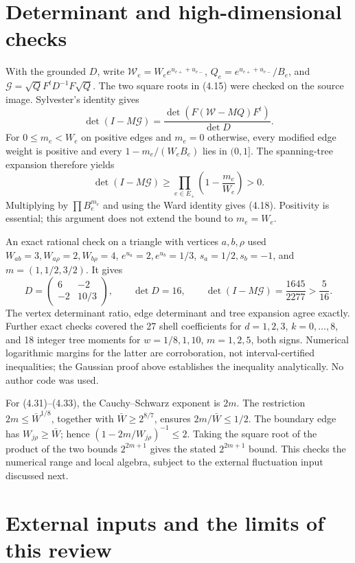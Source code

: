 \documentclass[10pt]{article}
\begin{document}
\section*{Determinant and high-dimensional checks}
With the grounded \(D\), write \(\mathcal W_e=W_e e^{u_{e+}+u_{e-}}\), \(Q_e=e^{u_{e+}+u_{e-}}/B_e\), and \(\mathcal G=\sqrt Q F^tD^{-1}F\sqrt Q\). The two square roots in (4.15) were checked on the source image. Sylvester’s identity gives \[\det(I-M\mathcal G)
 =\frac{\det(F(\mathcal W-MQ)F^t)}{\det D}.\] For \(0\leq m_e<W_e\) on positive edges and \(m_e=0\) otherwise, every modified edge weight is positive and every \(1-m_e/(W_eB_e)\) lies in \((0,1]\). The spanning-tree expansion therefore yields \[\det(I-M\mathcal G)\geq
 \prod_{e\in E_+}\left(1-\frac{m_e}{W_e}\right)>0.\] Multiplying by \(\prod B_e^{m_e}\) and using the Ward identity gives (4.18). Positivity is essential; this argument does not extend the bound to \(m_e=W_e\).\par
An exact rational check on a triangle with vertices \(a,b,\rho\) used \(W_{ab}=3,W_{a\rho}=2,W_{b\rho}=4\), \(e^{u_a}=2,e^{u_b}=1/3\), \(s_a=1/2,s_b=-1\), and \(m=(1,1/2,3/2)\). It gives \[D=\begin{pmatrix}6&-2\\-2&10/3\end{pmatrix},\qquad
 \det D=16,\qquad
 \det(I-M\mathcal G)=\frac{1645}{2277}>\frac5{16}.\] The vertex determinant ratio, edge determinant and tree expansion agree exactly. Further exact checks covered the 27 shell coefficients for \(d=1,2,3\), \(k=0,\ldots,8\), and 18 integer tree moments for \(w=1/8,1,10\), \(m=1,2,5\), both signs. Numerical logarithmic margins for the latter are corroboration, not interval-certified inequalities; the Gaussian proof above establishes the inequality analytically. No author code was used.\par
For (4.31)–(4.33), the Cauchy–Schwarz exponent is \(2m\). The restriction \(2m\leq\bar W^{1/8}\), together with \(\bar W\geq2^{8/7}\), ensures \(2m/\bar W\leq1/2\). The boundary edge has \(W_{j\rho}\geq\bar W\); hence \((1-2m/W_{j\rho})^{-1}\leq2\). Taking the square root of the product of the two bounds \(2^{2m+1}\) gives the stated \(2^{2m+1}\) bound. This checks the numerical range and local algebra, subject to the external fluctuation input discussed next.\par
\section*{External inputs and the limits of this review}
\end{document}
